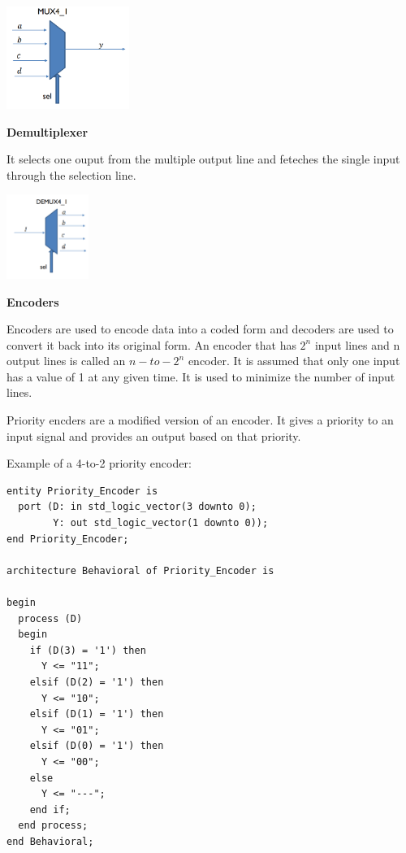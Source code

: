 \begin{center}
	\includegraphics[width=0.3\textwidth]{images/mux.png}
\end{center}


\textbf{Demultiplexer}

It selects one ouput from the multiple output line and feteches the single input through
the selection line.


\begin{center}
	\includegraphics[width=0.2\textwidth]{images/demux.png}
\end{center}


\textbf{Encoders}

Encoders are used to encode data into a coded form and decoders
are used to convert it back into its original form. An encoder that has
$2^n$ input lines and n output lines is called an $n-to-2^n$ encoder.
It is assumed that only one input has a value of 1 at any given time.
It is used to minimize the number of input lines.

Priority encders are a modified version of an encoder. It gives a priority
to an input signal and provides an output based on that priority.

Example of a 4-to-2 priority encoder:

\begin{verbatim}
entity Priority_Encoder is
  port (D: in std_logic_vector(3 downto 0);
        Y: out std_logic_vector(1 downto 0));
end Priority_Encoder;

architecture Behavioral of Priority_Encoder is

begin
  process (D)
  begin
    if (D(3) = '1') then
      Y <= "11";
    elsif (D(2) = '1') then
      Y <= "10";
    elsif (D(1) = '1') then
      Y <= "01";
    elsif (D(0) = '1') then
      Y <= "00";
    else
      Y <= "---";
    end if;
  end process;
end Behavioral;
\end{verbatim}

